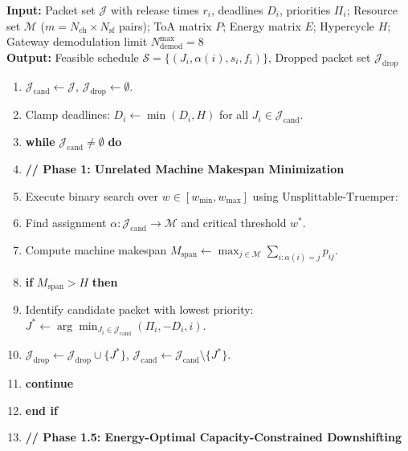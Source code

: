 \documentclass{article}
\begin{document}
\begin{algorithm}[t!]
\caption{LoRaWAN-Hypercycle-Scheduler$(\mathcal{J}, \mathcal{M}, P, E, H, N_{\text{demod}}^{\max})$}
\label{alg:lorawan_scheduler}
\small
\textbf{Input:} Packet set $\mathcal{J}$ with release times $r_i$, deadlines $D_i$, priorities $\Pi_i$; Resource set $\mathcal{M}$ ($m = N_{\text{ch}} \times N_{\text{sf}}$ pairs); ToA matrix $P$; Energy matrix $E$; Hypercycle $H$; Gateway demodulation limit $N_{\text{demod}}^{\max} = 8$\\
\textbf{Output:} Feasible schedule $\mathcal{S} = \{(J_i, \alpha(i), s_i, f_i)\}$, Dropped packet set $\mathcal{J}_{\text{drop}}$
\begin{enumerate}\setlength{\itemsep}{1pt}\setlength{\parskip}{0pt}
    \item $\mathcal{J}_{\text{cand}} \leftarrow \mathcal{J}$, $\mathcal{J}_{\text{drop}} \leftarrow \emptyset$.
    \item Clamp deadlines: $D_i \leftarrow \min(D_i, H)$ for all $J_i \in \mathcal{J}_{\text{cand}}$.
    \item \textbf{while} $\mathcal{J}_{\text{cand}} \neq \emptyset$ \textbf{do}
    \item \quad \textbf{// Phase 1: Unrelated Machine Makespan Minimization}
    \item \quad Execute binary search over $w \in [w_{\min}, w_{\max}]$ using $\text{Unsplittable-Truemper}$:
    \item \quad\quad Find assignment $\alpha: \mathcal{J}_{\text{cand}} \to \mathcal{M}$ and critical threshold $w^*$.
    \item \quad\quad Compute machine makespan $M_{\text{span}} \leftarrow \max_{j \in \mathcal{M}} \sum_{i: \alpha(i)=j} p_{ij}$.
    \item \quad \textbf{if} $M_{\text{span}} > H$ \textbf{then}
    \item \quad\quad Identify candidate packet with lowest priority: $J^* \leftarrow \arg\min_{J_i \in \mathcal{J}_{\text{cand}}} (\Pi_i, -D_i, i)$.
    \item \quad\quad $\mathcal{J}_{\text{drop}} \leftarrow \mathcal{J}_{\text{drop}} \cup \{J^*\}$, $\mathcal{J}_{\text{cand}} \leftarrow \mathcal{J}_{\text{cand}} \setminus \{J^*\}$.
    \item \quad\quad \textbf{continue} 
    \item \quad \textbf{end if}
    \item \quad \textbf{// Phase 1.5: Energy-Optimal Capacity-Constrained Downshifting}

\end{enumerate}
\end{algorithm}
\end{document}
